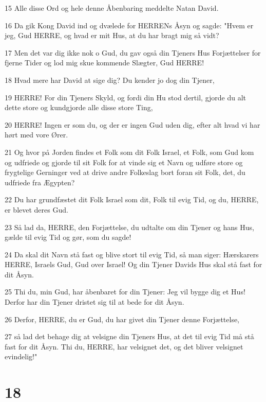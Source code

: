 \par 15 Alle disse Ord og hele denne Åbenbaring meddelte Natan David.
\par 16 Da gik Kong David ind og dvælede for HERRENs Åsyn og sagde: "Hvem er jeg, Gud HERRE, og hvad er mit Hus, at du har bragt mig så vidt?
\par 17 Men det var dig ikke nok o Gud, du gav også din Tjeners Hus Forjættelser for fjerne Tider og lod mig skue kommende Slægter, Gud HERRE!
\par 18 Hvad mere har David at sige dig? Du kender jo dog din Tjener,
\par 19 HERRE! For din Tjeners Skyld, og fordi din Hu stod dertil, gjorde du alt dette store og kundgjorde alle disse store Ting,
\par 20 HERRE! Ingen er som du, og der er ingen Gud uden dig, efter alt hvad vi har hørt med vore Ører.
\par 21 Og hvor på Jorden findes et Folk som dit Folk Israel, et Folk, som Gud kom og udfriede og gjorde til sit Folk for at vinde sig et Navn og udføre store og frygtelige Gerninger ved at drive andre Folkeslag bort foran sit Folk, det, du udfriede fra Ægypten?
\par 22 Du har grundfæstet dit Folk Israel som dit, Folk til evig Tid, og du, HERRE, er blevet deres Gud.
\par 23 Så lad da, HERRE, den Forjættelse, du udtalte om din Tjener og hans Hus, gælde til evig Tid og gør, som du sagde!
\par 24 Da skal dit Navn stå fast og blive stort til evig Tid, så man siger: Hærskarers HERRE, Israels Gud, Gud over Israel! Og din Tjener Davids Hus skal stå fast for dit Åsyn.
\par 25 Thi du, min Gud, har åbenbaret for din Tjener: Jeg vil bygge dig et Hus! Derfor har din Tjener dristet sig til at bede for dit Åsyn.
\par 26 Derfor, HERRE, du er Gud, du har givet din Tjener denne Forjættelse,
\par 27 så lad det behage dig at velsigne din Tjeners Hus, at det til evig Tid må stå fast for dit Åsyn. Thi du, HERRE, har velsignet det, og det bliver velsignet evindelig!"

\chapter{18}


